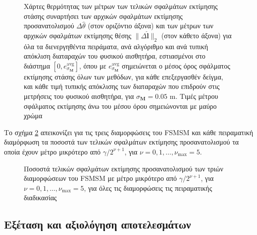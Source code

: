 \begin{figure}\vspace{2cm}\hspace{0.5cm}
  
  \vspace{1cm}
  \caption{\small Χάρτες θερμότητας των μέτρων των τελικών σφαλμάτων εκτίμησης
           στάσης συναρτήσει των αρχικών σφαλμάτων εκτίμησης προσανατολισμού
           $\Delta\hat{\theta}$ (στον οριζόντιο άξονα) και των μέτρων των
           αρχικών σφαλμάτων εκτίμησης θέσης $\|\Delta \hat{\bm{l}}\|_2$ (στον
           κάθετο άξονα) για όλα τα διενεργηθέντα πειράματα, ανά αλγόριθμο και
           ανά τυπική απόκλιση διαταραχών του φυσικού αισθητήρα, εστιασμένοι
           στο διάστημα $[0, e_{\sigma_{\bm{M}}}^{\text{avg}}]$, όπου με
           $e_{\sigma_{\bm{M}}}^{\text{avg}}$ σημειώνεται ο μέσος όρος
           σφάλματος εκτίμησης στάσης όλων των μεθόδων, για κάθε επεξεργασθέν
           δείγμα, και κάθε τιμή τυπικής απόκλισης των διαταραχών που επιδρούν
           στις μετρήσεις του φυσικού αισθητήρα, για $\sigma_{\bm{M}} = 0.05$
           m.  Τιμές μέτρου σφάλματος εκτίμησης άνω του μέσου όρου σημειώνονται
           με μαύρο χρώμα}
  \label{fig:02_04_05:09}
\end{figure}

Το σχήμα \ref{fig:02_04_05:13} απεικονίζει για τις τρεις διαμορφώσεις του FSMSM
και κάθε πειραματική διαμόρφωση τα ποσοστά των τελικών σφαλμάτων εκτίμησης
προσανατολισμού τα οποία έχουν μέτρο μικρότερο από $\gamma / 2^{\nu+1}$, για
$\nu = 0,1,\dots,\nu_{\max} = 5$.

\begin{figure}\centering
  
  \vspace{-0.5cm}
  \caption{\small Ποσοστά τελικών σφαλμάτων εκτίμησης προσανατολισμού των
           τριών διαμορφώσεων του FSMSM με μέτρο μικρότερο από $\gamma /
           2^{\nu+1}$, για $\nu = 0,1,\dots,\nu_{\max} = 5$, για όλες τις
           διαμορφώσεις τις πειραματικής διαδικασίας}
  \label{fig:02_04_05:13}
\end{figure}




\subsection{Εξέταση και αξιολόγηση αποτελεσμάτων}
\label{subsection:02_04_05:03}

